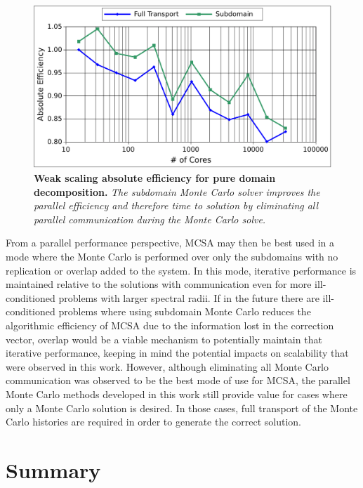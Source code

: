 \begin{figure}[t!]
  \begin{center}
    \includegraphics[width=6in]{chapters/parallel_mc/titan_weak_subdomain.pdf}
  \end{center}
  \caption{\textbf{Weak scaling absolute efficiency for pure domain
      decomposition.} \textit{The subdomain Monte Carlo solver
      improves the parallel efficiency and therefore time to solution
      by eliminating all parallel communication during the Monte Carlo
      solve.}}
  \label{fig:titan_weak_subdomain}
\end{figure}

From a parallel performance perspective, MCSA may then be best used in
a mode where the Monte Carlo is performed over only the subdomains
with no replication or overlap added to the system. In this mode,
iterative performance is maintained relative to the solutions with
communication even for more ill-conditioned problems with larger
spectral radii. If in the future there are ill-conditioned problems
where using subdomain Monte Carlo reduces the algorithmic efficiency
of MCSA due to the information lost in the correction vector, overlap
would be a viable mechanism to potentially maintain that iterative
performance, keeping in mind the potential impacts on scalability that
were observed in this work. However, although eliminating all Monte
Carlo communication was observed to be the best mode of use for MCSA,
the parallel Monte Carlo methods developed in this work still provide
value for cases where only a Monte Carlo solution is desired. In those
cases, full transport of the Monte Carlo histories are required in
order to generate the correct solution.

\section{Summary\ }
\label{sec:parallel_summary}

